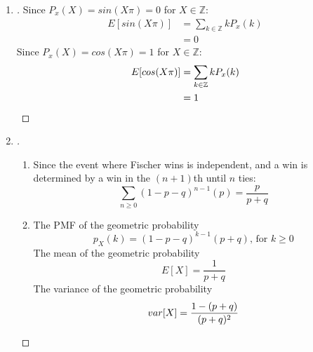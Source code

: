 \documentclass[paper=usletter, fontsize=12pt]{article}
\begin{document}
\begin{enumerate}
\begin{proof}[\unskip\nopunct]
\begin{enumerate}
            \end{enumerate}

        \end{proof}
        \vspace{0.2in}

        \item
        \begin{proof}[\unskip\nopunct]
            Since $P_x(X) = sin(X\pi) = 0$ for $X \in \mathbb{Z}$:
            \begin{align*}
                E[sin(X\pi)] & = \sum_{k \in \mathbb{Z}} kP_x(k)\\
                & = 0
            \end{align*}
            Since $P_x(X) = cos(X\pi) = 1$ for $X \in \mathbb{Z}$:
            \begin{align*}
                E[cos(X\pi)] & = \sum_{k \in \mathbb{Z}} kP_x(k)\\
                & = 1 \qedhere
            \end{align*}
        \end{proof}
        \vspace{0.2in}

        \item
        \begin{proof}[\unskip\nopunct]
            \begin{enumerate}

                \item Since the event where Fischer wins is independent, and a
                win is determined by a win in the $(n+1)$th until $n$ ties:
                \begin{equation*}
                    \sum_{n \ge 0} (1-p-q)^{n-1}(p) = \frac{p}{p+q}
                \end{equation*}

                \item The PMF of the geometric probability
                \begin{equation*}
                    p_X(k) = (1-p-q)^{k-1}(p+q) \text{, for } k \ge 0
                \end{equation*}
                The mean of the geometric probability
                \begin{equation*}
                    E[X] = \frac{1}{p+q}
                \end{equation*}
                The variance of the geometric probability
                \begin{equation*}
                    var[X] = \frac{1-(p+q)}{(p+q)^2} \qedhere
                \end{equation*}


\end{enumerate}
\end{proof}
\end{enumerate}
\end{document}
